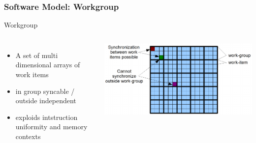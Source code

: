 \documentclass{beamer}
\begin{document}
\begin{frame}
    \frametitle{Software Model: Workgroup}
        Workgroup
        \begin{columns}
            \begin{itemize}
            \item A set of multi dimensional arrays of work items\\
            \item in group syncable / outside independent
            \item exploids intstruction uniformity and memory contexts
            \end{itemize} 
            \includegraphics[width=\textwidth]{res/WorkGroupItemStructure.png}   
    \end{columns}
\end{frame}
\end{document}
